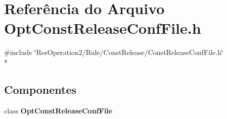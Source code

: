 \section{Referência do Arquivo Opt\+Const\+Release\+Conf\+File.\+h}
\label{_opt_const_release_conf_file_8h}
{\ttfamily \#include \char`\"{}Res\+Operation2/\+Rule/\+Const\+Release/\+Const\+Release\+Conf\+File.\+h\char`\"{}}\\*
\subsection*{Componentes}
\begin{DoxyCompactItemize}
\item 
class {\bf Opt\+Const\+Release\+Conf\+File}
\end{DoxyCompactItemize}
